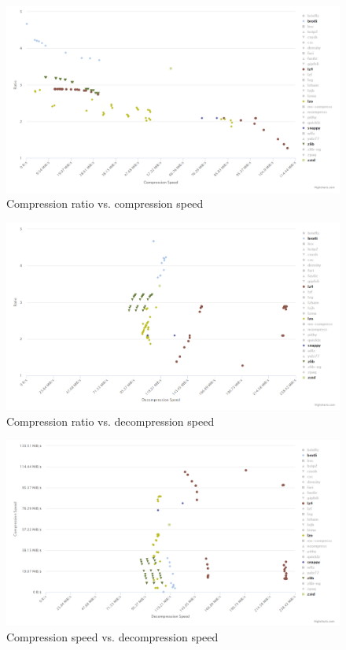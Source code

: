 \documentclass[10pt, a4paper]{report}
\begin{document}
\begin{figure}
	\centering
	\includegraphics[width=15cm]{./assets/img/squash/ratio_compress.png}
	\caption{Compression ratio vs. compression speed}
	\label{fig:ratio_compress}
	\vspace{0.5cm}
\end{figure}
\begin{figure}
	\centering
	\includegraphics[width=15cm]{./assets/img/squash/ratio_decompress.png}
	\caption{Compression ratio vs. decompression speed}
	\label{fig:ratio_decompress}
	\vspace{0.5cm}
\end{figure}
\begin{figure}
	\centering
	\includegraphics[width=15cm]{./assets/img/squash/compress_decompress.png}
	\caption{Compression speed vs. decompression speed}
	\label{fig:compress_decompress}
	\vspace{0.5cm}
\end{figure}
\end{document}
